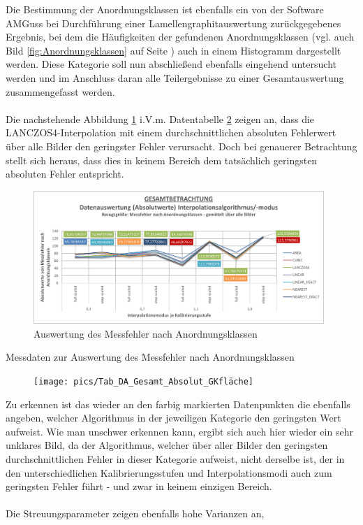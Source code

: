 \documentclass[
fontsize=10pt, 
listof = totoc,
parskip = half	
]{report}
\begin{document}
Die Bestimmung der Anordnungsklassen ist ebenfalls ein von der Software AMGuss bei Durchführung einer Lamellengraphitauswertung zurückgegebenes Ergebnis, bei dem die Häufigkeiten der gefundenen Anordnungsklassen (vgl. auch Bild \ref{fig:Anordnungsklassen} auf Seite \pageref{fig:Anordnungsklassen}) auch in einem Histogramm dargestellt werden.  Diese Kategorie soll nun abschließend ebenfalls eingehend untersucht werden und im Anschluss daran alle Teilergebnisse zu einer Gesamtauswertung zusammengefasst werden.
\\\\
\noindent Die nachstehende Abbildung \ref{fig:DAGesamtAbsolutAKL} i.V.m. Datentabelle \ref{tab:DAGesamtAbsolutAKL} zeigen an, dass die LANCZOS4-Interpolation mit einem durchschnittlichen absoluten Fehlerwert über alle Bilder den geringster Fehler verursacht. Doch bei genauerer Betrachtung stellt sich heraus, dass dies in keinem Bereich dem tatsächlich geringsten absoluten Fehler entspricht. 

\begin{figure}[H]
	\centering
	\includegraphics[width=11cm, height=\textheight, keepaspectratio]{pics/DA_Gesamt_Absolut_AKL}
	\caption{Auswertung des Messfehler nach Anordnungsklassen}
	\label{fig:DAGesamtAbsolutAKL}
\end{figure}

\begin{table}[H]
	\caption{Messdaten zur Auswertung des Messfehler nach Anordnungsklassen}
	\begin{figure}[H]
		\centering
		\texttt{[image: pics/Tab\_DA\_Gesamt\_Absolut\_GKfläche]}
		\label{tab:DAGesamtAbsolutAKL}
	\end{figure}
\end{table}

\noindent Zu erkennen ist das wieder an den farbig markierten Datenpunkten die ebenfalls angeben, welcher Algorithmus in der jeweiligen Kategorie den geringsten Wert aufweist. Wie man unschwer erkennen kann, ergibt sich auch hier wieder ein sehr unklares Bild, da der Algorithmus, welcher über aller Bilder den geringsten durchschnittlichen Fehler in dieser Kategorie aufweist, nicht derselbe ist, der in den unterschiedlichen Kalibrierungsstufen und Interpolationsmodi auch zum geringsten Fehler führt - und zwar in keinem einzigen Bereich.
\\\\
Die Streuungsparameter zeigen ebenfalls hohe Varianzen an, 
\end{document}
